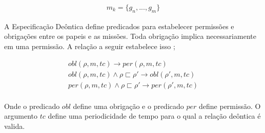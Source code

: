 \begin{eqnarray}\nonumber
	m_k = \{ g_n,...,g_m\}
\end{eqnarray}


A Especificação Deôntica define predicados para estabelecer permissões e obrigações entre os papeis e as missões. Toda obrigação implica necessariamente em uma permissão. A relação a seguir 
estabelece isso \cite{moiseframework} \cite{deonticOne}; 

\begin{eqnarray}\nonumber
	obl(\rho,m,tc) \to per(\rho,m,tc) \\
	obl(\rho,m,tc) \wedge \rho \sqsubset \rho' \to obl(\rho',m,tc) \\
	per(\rho,m,tc) \wedge \rho \sqsubset \rho' \to per(\rho',m,tc) \\	
\end{eqnarray}

Onde o predicado $obl$ define uma obrigação e o predicado $per$ define permissão. O argumento $tc$ define uma periodicidade de tempo para o qual a relação deôntica é valida. 
